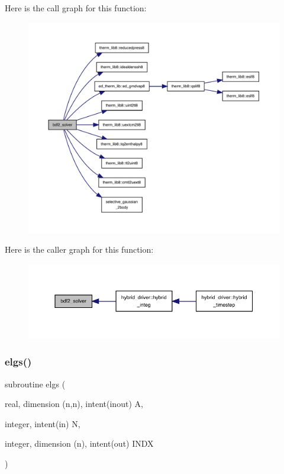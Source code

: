 Here is the call graph for this function\+:
\nopagebreak
\begin{figure}[H]
\begin{center}
\leavevmode
\includegraphics[width=350pt]{bdf2__solver_8f90_a341c7d28b12d70f7ad3cbf4b4919f510_cgraph}
\end{center}
\end{figure}
Here is the caller graph for this function\+:
\nopagebreak
\begin{figure}[H]
\begin{center}
\leavevmode
\includegraphics[width=350pt]{bdf2__solver_8f90_a341c7d28b12d70f7ad3cbf4b4919f510_icgraph}
\end{center}
\end{figure}
\mbox{\label{bdf2__solver_8f90_a20b2b6c5902d735ebf45af8197ca2172}} 
\subsubsection{\texorpdfstring{elgs()}{elgs()}}
{\footnotesize\ttfamily subroutine elgs (\begin{DoxyParamCaption}\item[{real, dimension (n,n), intent(inout)}]{A,  }\item[{integer, intent(in)}]{N,  }\item[{integer, dimension (n), intent(out)}]{I\+N\+DX }\end{DoxyParamCaption})}

